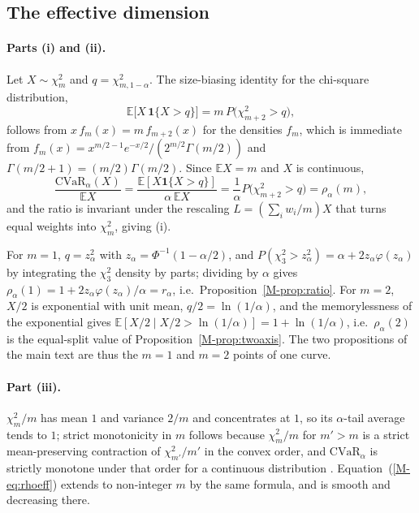 \documentclass[aps,pra,onecolumn,notitlepage,superscriptaddress,nofootinbib,floatfix]{revtex4-2}
\newcommand{\cvar}{\mathrm{CVaR}}
\newcommand{\E}{\mathbb{E}}
\begin{document}
\subsection{The effective dimension}
\label{sec:proofs-meff}

\paragraph*{Parts (i) and (ii).} Let $X\sim\chi^2_m$ and $q=\chi^2_{m,1-\alpha}$.
The size-biasing identity for the chi-square distribution,
\begin{equation}
\E\big[X\,\mathbf 1\{X>q\}\big]=m\,P\big(\chi^2_{m+2}>q\big),
\label{eq:sizebias}
\end{equation}
follows from $x\,f_m(x)=m\,f_{m+2}(x)$ for the densities $f_m$, which is
immediate from $f_m(x)=x^{m/2-1}e^{-x/2}/(2^{m/2}\Gamma(m/2))$ and
$\Gamma(m/2+1)=(m/2)\Gamma(m/2)$. Since $\E X=m$ and $X$ is continuous,
\begin{equation}
\frac{\cvar_\alpha(X)}{\E X}=\frac{\E[X\mathbf 1\{X>q\}]}{\alpha\,\E X}
=\frac1\alpha P\big(\chi^2_{m+2}>q\big)=\rho_\alpha(m),
\end{equation}
and the ratio is invariant under the rescaling $L=(\sum_iw_i/m)X$ that turns
equal weights into $\chi^2_m$, giving (i).

For $m=1$, $q=z_\alpha^2$ with $z_\alpha=\Phi^{-1}(1-\alpha/2)$, and
$P(\chi^2_3>z_\alpha^2)=\alpha+2z_\alpha\varphi(z_\alpha)$ by integrating the
$\chi^2_3$ density by parts; dividing by $\alpha$ gives
$\rho_\alpha(1)=1+2z_\alpha\varphi(z_\alpha)/\alpha=r_\alpha$, i.e.\
Proposition~\ref{M-prop:ratio}. For $m=2$, $X/2$ is exponential with unit
mean, $q/2=\ln(1/\alpha)$, and the memorylessness of the exponential gives
$\E[X/2\mid X/2>\ln(1/\alpha)]=1+\ln(1/\alpha)$, i.e.\ $\rho_\alpha(2)$ is the
equal-split value of Proposition~\ref{M-prop:twoaxis}. The two propositions of
the main text are thus the $m=1$ and $m=2$ points of one curve.

\paragraph*{Part (iii).} $\chi^2_m/m$ has mean $1$ and variance $2/m$ and
concentrates at $1$, so its $\alpha$-tail average tends to $1$; strict
monotonicity in $m$ follows because $\chi^2_{m}/m$ for $m'>m$ is a strict
mean-preserving contraction of $\chi^2_{m'}/m'$ in the convex order, and
$\cvar_\alpha$ is strictly monotone under that order for a continuous
distribution \cite{Shaked2007}. Equation~(\ref{M-eq:rhoeff}) extends to
non-integer $m$ by the same formula, and is smooth and decreasing there.
\end{document}
